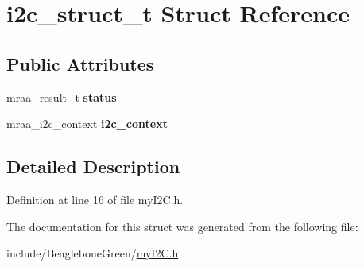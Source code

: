 \hypertarget{structi2c__struct__t}{}\section{i2c\+\_\+struct\+\_\+t Struct Reference}
\label{structi2c__struct__t}
\subsection*{Public Attributes}
\begin{DoxyCompactItemize}
\item 
\mbox{\label{structi2c__struct__t_a220f85831945900c2b99ae0f1a338944}} 
mraa\+\_\+result\+\_\+t {\bfseries status}
\item 
\mbox{\label{structi2c__struct__t_ac7c93248045c6c2f56438fae7cda1a75}} 
mraa\+\_\+i2c\+\_\+context {\bfseries i2c\+\_\+context}
\end{DoxyCompactItemize}


\subsection{Detailed Description}


Definition at line 16 of file my\+I2\+C.\+h.



The documentation for this struct was generated from the following file\+:\begin{DoxyCompactItemize}
\item 
include/\+Beaglebone\+Green/\hyperlink{myI2C_8h}{my\+I2\+C.\+h}\end{DoxyCompactItemize}
